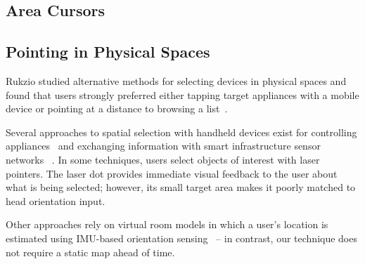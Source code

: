 \subsection{Area Cursors}

\subsection{Pointing in Physical Spaces}
Rukzio studied alternative methods for selecting devices in physical spaces and found that users strongly preferred either tapping target appliances with a mobile device or pointing at a distance to browsing a list~\cite{rukzio_experimental_2006}.

Several approaches to spatial selection with handheld devices exist for controlling appliances~\cite{beigl_point_1999,patel_2-way_2003,wilson_xwand:_2003,schmidt_picontrol:_2012,kemp_point-and-click_2008} and exchanging information with smart infrastructure sensor networks ~\cite{lifton_tricorder:_2007,mittal_ubicorder:_2011,costanza_sensortune:_2010}. In some techniques, users select objects of interest with laser pointers. The laser dot provides immediate visual feedback to the user about what is being selected; however, its small target area makes it poorly matched to head orientation input.

Other approaches rely on virtual room models in which a user's location is estimated using IMU-based orientation sensing~\cite{wilson_xwand:_2003,lifton_tricorder:_2007} -- in contrast, our technique does not require a static map ahead of time.

